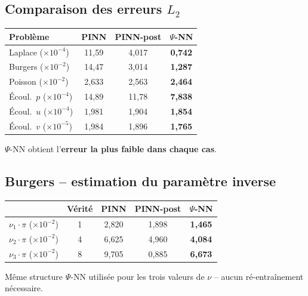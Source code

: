\documentclass[11pt,a4paper]{article}
\newcommand{\PsiNN}{$\Psi$-NN}
\begin{document}
\subsection{Comparaison des erreurs $L_2$}

\begin{center}
\renewcommand{\arraystretch}{1.2}
\begin{tabular}{@{}l c c c@{}}
\toprule
\textbf{Problème} & \textbf{PINN} & \textbf{PINN-post} & \textbf{\PsiNN{}} \\
\midrule
Laplace ($\times10^{-4}$)       & 11,59 & 4,017 & \textbf{0,742} \\
Burgers ($\times10^{-2}$)       & 14,47 & 3,014 & \textbf{1,287} \\
Poisson ($\times10^{-2}$)       & 2,633 & 2,563 & \textbf{2,464} \\
Écoul.\ $p$ ($\times10^{-4}$)   & 14,89 & 11,78 & \textbf{7,838} \\
Écoul.\ $u$ ($\times10^{-4}$)   & 1,981 & 1,904 & \textbf{1,854} \\
Écoul.\ $v$ ($\times10^{-5}$)   & 1,984 & 1,896 & \textbf{1,765} \\
\bottomrule
\end{tabular}
\end{center}

\PsiNN{} obtient l'\textbf{erreur la plus faible dans chaque cas}.

\subsection{Burgers -- estimation du paramètre inverse}

\begin{center}
\renewcommand{\arraystretch}{1.2}
\begin{tabular}{@{}l c c c c@{}}
\toprule
& \textbf{Vérité} & \textbf{PINN} & \textbf{PINN-post} & \textbf{\PsiNN{}} \\
\midrule
$\nu_1\!\cdot\!\pi$ ($\times10^{-2}$) & 1 & 2,820 & 1,898 & \textbf{1,465} \\
$\nu_2\!\cdot\!\pi$ ($\times10^{-2}$) & 4 & 6,625 & 4,960 & \textbf{4,084} \\
$\nu_3\!\cdot\!\pi$ ($\times10^{-2}$) & 8 & 9,705 & 0,885 & \textbf{6,673} \\
\bottomrule
\end{tabular}
\end{center}

Même structure \PsiNN{} utilisée pour les trois valeurs de $\nu$ -- aucun ré-entraînement nécessaire.
\end{document}
